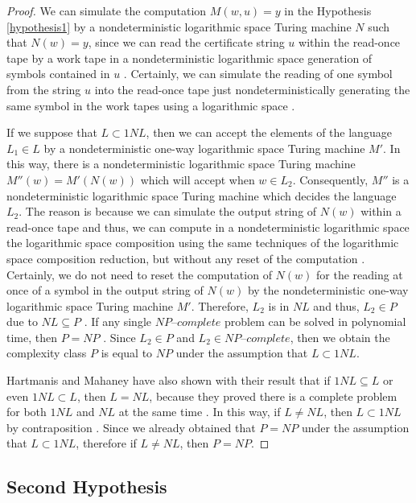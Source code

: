 \documentclass[a4paper,UKenglish,cleveref, autoref]{lipics-v2019}
\begin{document}
\begin{proof}
We can simulate the computation $M(w, u) = y$ in the Hypothesis \ref{hypothesis1} by a nondeterministic logarithmic space Turing machine $N$ such that $N(w) = y$, since we can read the certificate string $u$ within the read-once tape by a work tape in a nondeterministic logarithmic space generation of symbols contained in $u$ \cite{Pap03}. Certainly, we can simulate the reading of one symbol from the string $u$ into the read-once tape just nondeterministically generating the same symbol in the work tapes using a logarithmic space \cite{Pap03}.

If we suppose that $L \subset 1NL$, then we can accept the elements of the language $L_{1} \in L$ by a nondeterministic one-way logarithmic space Turing machine $M'$. In this way, there is a nondeterministic logarithmic space Turing machine $M''(w) = M'(N(w))$ which will accept when $w \in L_{2}$. Consequently, $M''$ is a nondeterministic logarithmic space Turing machine which decides the language $L_{2}$. The reason is because we can simulate the output string of $N(w)$ within a read-once tape and thus, we can compute in a nondeterministic logarithmic space the logarithmic space composition using the same techniques of the logarithmic space composition reduction, but without any reset of the computation \cite{Pap03}. Certainly, we do not need to reset the computation of $N(w)$ for the reading at once of a symbol in the output string of $N(w)$ by the nondeterministic one-way logarithmic space Turing machine $M'$. Therefore, $L_{2}$ is in $NL$ and thus, $L_{2} \in P$ due to $NL \subseteq P$ \cite{Pap03}. If any single $\textit{NP--complete}$ problem can be solved in polynomial time, then $P = NP$ \cite{CLRS01}. Since $L_{2} \in P$ and $L_{2} \in \textit{NP--complete}$, then we obtain the complexity class $P$ is equal to $NP$ under the assumption that $L \subset 1NL$.

Hartmanis and Mahaney have also shown with their result that if $1NL \subseteq L$ or even $1NL \subset L$, then $L=NL$, because they proved there is a complete problem for both $1NL$ and $NL$ at the same time \cite{HM81}. In this way, if $L \neq NL$, then $L \subset 1NL$ by contraposition \cite{Pap03}. Since we already obtained that $P = NP$ under the assumption that $L \subset 1NL$, therefore if $L \neq NL$, then $P = NP$.
\end{proof}

\subsection{Second Hypothesis}
\end{document}
